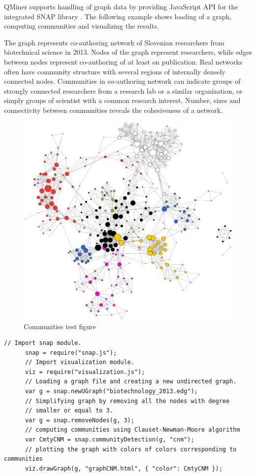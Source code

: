 \documentclass{article} %
\begin{document}
QMiner supports handling of graph data by providing JavaScript API for the integrated SNAP library \cite{snap}. 
The following example shows loading of a graph, computing communities and visualizing the results.

The graph represents co-authoring network of Slovenian researchers from biotechnical science in 2013. Nodes of the graph represent researchers, while edges between nodes represent co-authoring of at least on publication. Real networks often have community structure with several regions of internally densely connected nodes. Communities in co-authoring network can indicate groups of strongly connected researchers from a research lab or a similar organization, or simply groups of scientist with a common research interest. Number, sizes and connectivity between communities reveals the cohesiveness of a network.

\begin{figure}[h]
\begin{center}
\includegraphics[scale=0.25]{communitiestest.jpg}
\caption{Communities test figure}
\end{center}
\end{figure}

      \begin{lstlisting}[caption=Graph analysis]
      // Import snap module.
      snap = require("snap.js");
      // Import visualization module.
      viz = require("visualization.js");
      // Loading a graph file and creating a new undirected graph.
      var g = snap.newUGraph("biotechnology_2013.edg");
      // Simplifying graph by removing all the nodes with degree
      // smaller or equal to 3.
      var g = snap.removeNodes(g, 3);
      // computing communities using Clauset-Newman-Moore algorithm
      var CmtyCNM = snap.communityDetection(g, "cnm");
      // plotting the graph with colors of colors corresponding to communities
      viz.drawGraph(g, "graphCNM.html", { "color": CmtyCNM });
      \end{lstlisting}
\end{document}
